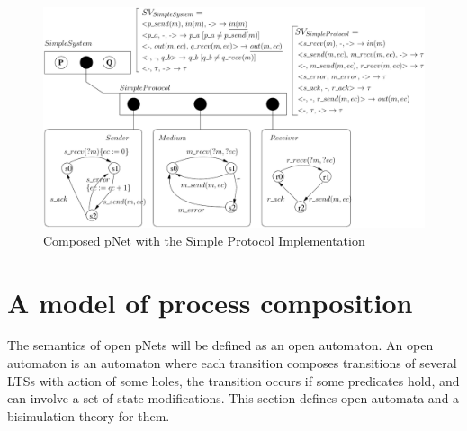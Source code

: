 \documentclass{lmcs}
\begin{document}
  
\begin{figure}[t]
  \centerline{\includegraphics[width=12cm]{XFIG/SimpleProt2-pNet-tau}}
  \caption{Composed pNet with the Simple Protocol Implementation}  \label{SimpleProt:Impl}
\end{figure}

\section{A model of process composition}\label{sec:OT}


The semantics of open pNets will be defined  as an open automaton. An open
automaton is an automaton where each transition composes transitions of several LTSs with
action of some holes, the transition occurs if some predicates hold, and can involve a 
set of state modifications. This section defines open automata and a bisimulation theory for them.
\end{document}
